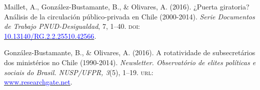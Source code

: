 
\begin{publications}

\begin{benumerate}{4}


\item{Maillet, A., González-Bustamante, B., \& Olivares, A. (2016). ¿Puerta giratoria? Análisis de la circulación público-privada en Chile (2000-2014). {\itshape Serie Documentos de Trabajo PNUD-Desigualdad}, 7, 1--40. {\scshape doi:} \\ \href{http://doi.org/10.13140/RG.2.2.25510.42566}{\textcolor{blue}{10.13140/RG.2.2.25510.42566}}.}\vspace{1mm}


\item{González-Bustamante, B., \& Olivares, A. (2016). A rotatividade de subsecretários dos ministérios no Chile (1990-2014). {\itshape Newsletter. Observat\'orio de elites pol\'iticas e sociais do Brasil. NUSP/UFPR, 3}(5), 1--19. {\scshape url:} \\ \href{https://www.researchgate.net/publication/321993740_A_rotatividade_de_subsecretarios_dos_ministerios_no_Chile_1990-2014}{\textcolor{blue}{www.researchgate.net}}.}\vspace{1mm}



\end{benumerate}
\end{publications}
